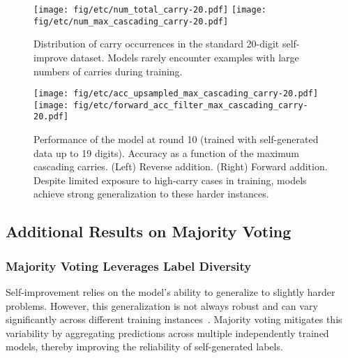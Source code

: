 \begin{figure}[ht!]
    \centering
    \texttt{[image: fig/etc/num\_total\_carry-20.pdf]}
    \hspace{1mm}
    \texttt{[image: fig/etc/num\_max\_cascading\_carry-20.pdf]}
    \caption{Distribution of carry occurrences in the standard 20-digit self-improve dataset. Models rarely encounter examples with large numbers of carries during training. }
    \label{fig:num_carries}
\end{figure}



\begin{figure}[ht!]
    \centering
    \texttt{[image: fig/etc/acc\_upsampled\_max\_cascading\_carry-20.pdf]}
    \hspace{1mm}
    \texttt{[image: fig/etc/forward\_acc\_filter\_max\_cascading\_carry-20.pdf]}
    \caption{Performance of the model at round 10 (trained with self-generated data up to 19 digits). Accuracy as a function of the maximum cascading carries. (Left) Reverse addition. (Right) Forward addition. Despite limited exposure to high-carry cases in training, models achieve strong generalization to these harder instances.}
    \label{fig:carry_acc}
\end{figure}

\subsection{Additional Results on Majority Voting}
\subsubsection{Majority Voting Leverages Label Diversity}\label{sec:mv_diversity}

Self-improvement relies on the model's ability to generalize to slightly harder problems. However, this generalization is not always robust and can vary significantly across different training instances~\citep{zhou2024transformers}. Majority voting mitigates this variability by aggregating predictions across multiple independently trained models, thereby improving the reliability of self-generated labels.


